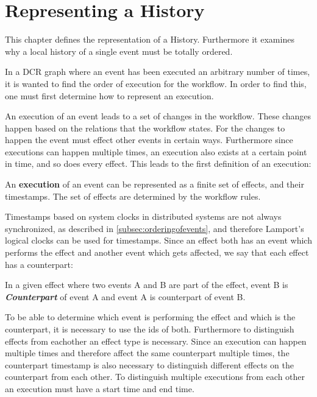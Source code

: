 \chapter{Representing a History}\label{chap:representing-a-history}
	This chapter defines the representation of a History. Furthermore it examines why a local history of a single event must be totally ordered.
	
	\newpar	In a DCR graph where an event has been executed an arbitrary number of times, it is wanted to find the order of execution for the workflow. In order to find this, one must first determine how to represent an execution.
	
	\newpar An execution of an event leads to a set of changes in the workflow. These changes happen based on the relations that the workflow states. For the changes to happen the event must effect other events in certain ways. Furthermore since executions can happen multiple times, an execution also exists at a certain point in time, and so does every effect. This leads to the first definition of an execution:
	
	\begin{definition}
		An \textbf{execution} of an event can be represented as a finite set of effects, and their timestamps. The set of effects are determined by the workflow rules.
	\end{definition}
	
	Timestamps based on system clocks in distributed systems are not always synchronized, as described in \autoref{subsec:orderingofevents}, and therefore Lamport's logical clocks can be used for timestamps. Since an effect both has an event which performs the effect and another event which gets affected, we say that each effect has a counterpart:
	

	\begin{definition}
		In a given effect where two events A and B are part of the effect, event B is \textbf{\textit{Counterpart}} of event A and event A is counterpart of event B.
	\end{definition}
	
	\newpar To be able to determine which event is performing the effect and which is the counterpart, it is necessary to use the ids of both. Furthermore to distinguish effects from eachother an effect type is necessary. Since an execution can happen multiple times and therefore affect the same counterpart multiple times, the counterpart timestamp is also necessary to distinguish different effects on the counterpart from each other. To distinguish multiple executions from each other an execution must have a start time and end time.
	
